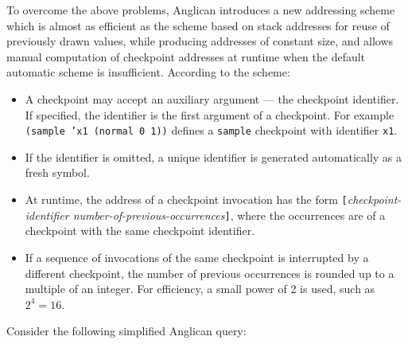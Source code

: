 \documentclass[sigconf]{acmart}
\begin{document}
To overcome the above problems, Anglican introduces a new
addressing scheme which is almost as efficient as the scheme
based on stack addresses for reuse of previously drawn values,
while producing addresses of constant size, and allows manual
computation of checkpoint addresses at runtime when the default
automatic scheme is insufficient. According to the scheme:
\begin{itemize}
    \item A checkpoint may accept an auxiliary argument --- the
        checkpoint identifier. If specified, the identifier is the first
        argument of a checkpoint. For example \texttt{(sample
        'x1  (normal 0 1))} defines a \texttt{sample} checkpoint
        with identifier \texttt{x1}.
    \item If the identifier is omitted, a unique identifier is
        generated automatically as a fresh symbol.
    \item At runtime, the address of a checkpoint invocation has
        the form
        \texttt{[}\textit{checkpoint-identifier
        number-of-previous-occurrences}\texttt{]}, where the
        occurrences are of a checkpoint with the same checkpoint
        identifier.
    \item If a sequence of invocations of the same checkpoint is
        interrupted by a different checkpoint, the number of
        previous occurrences is rounded up to a multiple of
        an integer. For efficiency, a small power of 2 is used,
        such as $2^4 = 16$.
\end{itemize}

\noindent Consider the following simplified Anglican query:
\end{document}

